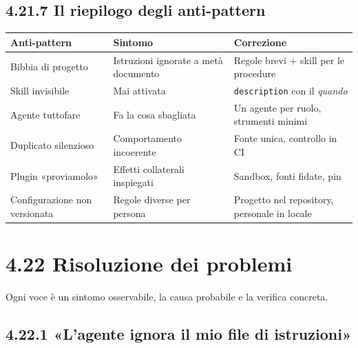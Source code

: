\documentclass[
  italian,
  10pt,
]{book}
\newcounter{none} %
\begin{document}
\subsection{4.21.7 Il riepilogo degli
anti-pattern}\label{il-riepilogo-degli-anti-pattern}

{\def\LTcaptype{none} %
\begin{longtable}[]{@{}
  >{\raggedright\arraybackslash}p{}
  >{\raggedright\arraybackslash}p{}
  >{\raggedright\arraybackslash}p{}@{}}
\toprule\noalign{}
\begin{minipage}[b]{\linewidth}\raggedright
Anti-pattern
\end{minipage} & \begin{minipage}[b]{\linewidth}\raggedright
Sintomo
\end{minipage} & \begin{minipage}[b]{\linewidth}\raggedright
Correzione
\end{minipage} \\
\midrule\noalign{}
\endhead
\bottomrule\noalign{}
\endlastfoot
Bibbia di progetto & Istruzioni ignorate a metà documento & Regole brevi
+ skill per le procedure \\
Skill invisibile & Mai attivata & \texttt{description} con il
\emph{quando} \\
Agente tuttofare & Fa la cosa sbagliata & Un agente per ruolo, strumenti
minimi \\
Duplicato silenzioso & Comportamento incoerente & Fonte unica, controllo
in CI \\
Plugin «proviamolo» & Effetti collaterali inspiegati & Sandbox, fonti
fidate, pin \\
Configurazione non versionata & Regole diverse per persona & Progetto
nel repository, personale in locale \\
\end{longtable}
}

\section{4.22 Risoluzione dei problemi}\label{risoluzione-dei-problemi}

Ogni voce è un sintomo osservabile, la causa probabile e la verifica
concreta.

\subsection{4.22.1 «L'agente ignora il mio file di
istruzioni»}\label{lagente-ignora-il-mio-file-di-istruzioni}
\end{document}
